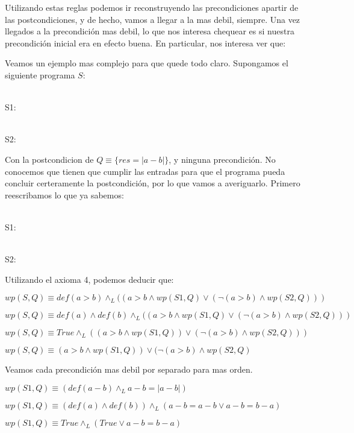 \documentclass{article}
\begin{document}
Utilizando estas reglas podemos ir reconstruyendo las precondiciones apartir de las postcondiciones, y de hecho, vamos a llegar a la mas debil, siempre. Una vez llegados a la precondición mas debil, lo que nos interesa chequear es si nuestra precondición inicial era en efecto buena. En particular, nos interesa ver que:


Veamos un ejemplo mas complejo para que quede todo claro. Supongamos el siguiente programa $S$:

 \\ S1:

 \\ S2:


Con la postcondicion de $Q \equiv \{ res = |a-b| \}$, y ninguna precondición. No conocemos que tienen que cumplir las entradas para que el programa pueda concluir certeramente la postcondición, por lo que vamos a averiguarlo. Primero reescribamos lo que ya sabemos:

 \\ S1:

 \\ S2:



Utilizando el axioma 4, podemos deducir que:

$wp(S, Q) \equiv def(a > b) \land_{L} ((a > b \land wp(S1, Q) \lor (\neg (a > b) \land wp(S2, Q)))$

$wp(S, Q) \equiv def(a) \land def(b) \land_{L} ((a > b \land wp(S1, Q) \lor (\neg (a > b) \land wp(S2, Q)))$

$wp(S, Q) \equiv True \land_{L} ((a > b \land wp(S1, Q)) \lor (\neg (a > b) \land wp(S2, Q)))$

$wp(S, Q) \equiv (a > b \land wp(S1, Q)) \lor (\neg (a > b) \land wp(S2, Q)$

Veamos cada precondición mas debil por separado para mas orden.

$wp(S1, Q) \equiv (def(a - b) \land_{L} a-b = |a-b|)$

$wp(S1, Q) \equiv (def(a) \land def(b)) \land_{L} (a-b = a-b \lor a-b = b-a)$

$wp(S1, Q) \equiv True \land_{L} (True \lor a-b = b-a)$
\end{document}
